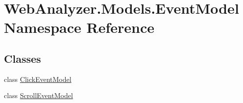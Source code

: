\hypertarget{namespace_web_analyzer_1_1_models_1_1_event_model}{}\section{Web\+Analyzer.\+Models.\+Event\+Model Namespace Reference}
\label{namespace_web_analyzer_1_1_models_1_1_event_model}
\subsection*{Classes}
\begin{DoxyCompactItemize}
\item 
class \hyperlink{class_web_analyzer_1_1_models_1_1_event_model_1_1_click_event_model}{Click\+Event\+Model}
\item 
class \hyperlink{class_web_analyzer_1_1_models_1_1_event_model_1_1_scroll_event_model}{Scroll\+Event\+Model}
\end{DoxyCompactItemize}
